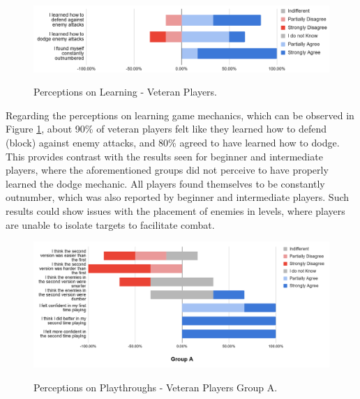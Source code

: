 \begin{figure}[!ht]
    \begin{center}
    \caption{Perceptions on Learning - Veteran Players.}
        \includegraphics[width=36em]{figures/fig-perception-learning-veteran-players.png}
        \label{fig:perception-learning-veteran-players}
    \end{center}
\end{figure}

Regarding the perceptions on learning game mechanics, which can be observed in Figure \ref{fig:perception-learning-veteran-players}, about 90\% of veteran players felt like they learned how to defend (block) against enemy attacks, and 80\% agreed to have learned how to dodge. This provides contrast with the results seen for beginner and intermediate players, where the aforementioned groups did not perceive to have properly learned the dodge mechanic. All players found themselves to be constantly outnumber, which was also reported by beginner and intermediate players. Such results could show issues with the placement of enemies in levels, where players are unable to isolate targets to facilitate combat.

\begin{figure}[!ht]
    \begin{center}
    \caption{Perceptions on Playthroughs - Veteran Players Group A.}
        \includegraphics[width=36em]{figures/fig-perception-versions-veteran-players-group-a.png}
        \label{fig:perception-playthrough-veteran-players-group-a}
    \end{center}
\end{figure}

